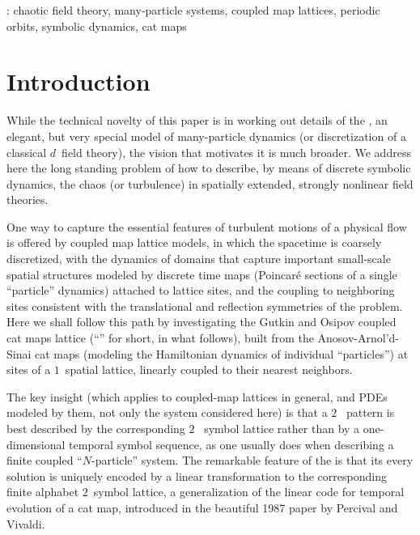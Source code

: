 \documentclass[12pt]{iopart}
\begin{document}
\vspace{2pc}
:
chaotic field theory, many-particle systems, coupled map lattices,
periodic orbits, symbolic dynamics, cat maps

\submitto{\NL}
    \ifsubmission
\maketitle %
    \fi

\section{Introduction}
\label{sect:intro}

While the technical novelty of this paper is in working out details of
the {\catlatt}, an elegant, but very special  model of many-particle
dynamics (or discretization of a classical $d$\dmn\ field theory), the
vision that motivates it is much broader. We address here the long
standing problem of how to describe, by means of discrete symbolic
dynamics, the {\spt} chaos (or turbulence) in spatially extended,
strongly nonlinear field theories.

One way to capture  the essential features of turbulent motions of a
physical flow is offered by coupled map lattice models, in which the
spacetime is coarsely discretized, with the dynamics of domains that
capture important small-scale spatial structures modeled by discrete time
maps (Poincar\'e sections of a single ``particle'' dynamics) attached to
lattice sites, and the coupling to neighboring sites consistent with the
translational and reflection symmetries of the problem. Here we shall
follow this path  by investigating the Gutkin and Osipov
coupled cat maps lattice (``{\catlatt}'' for short, in what follows),
built from the Anosov-Arnol'd-Sinai cat maps (modeling the
Hamiltonian dynamics of individual ``particles'') at sites of a $1$\dmn\
spatial lattice, linearly coupled to their nearest neighbors.

The key insight (which applies to coupled-map lattices in general, and
PDEs modeled by them, not only the system considered here) is that a
$2$\dmn\ {\spt} pattern is best described by the corresponding $2$\dmn\
{\spt} symbol lattice rather than by  a one-dimensional temporal symbol
sequence, as one usually does when describing a finite coupled
``$N$-particle'' system. The remarkable feature of the {\catlatt}  is
that its every solution is uniquely encoded by a linear transformation to
the corresponding finite alphabet $2$\dmn\ symbol lattice, a {\spt}
generalization of the {linear code} for temporal evolution of a {cat
map}, introduced in the beautiful 1987 paper by Percival and
Vivaldi\rf{PerViv}.
\end{document}
